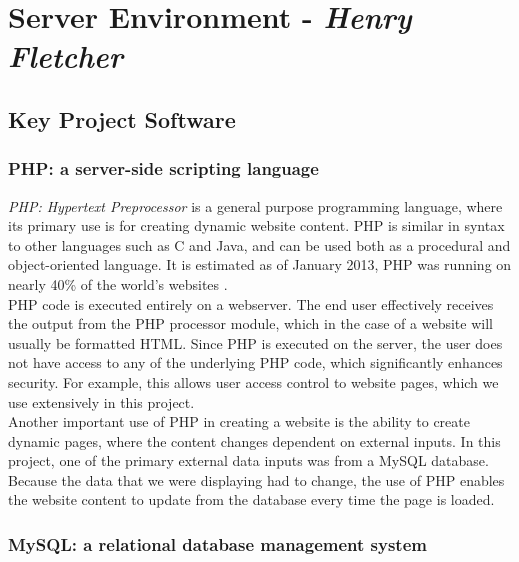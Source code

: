 \documentclass[11pt]{article}
\begin{document}
\section{Server Environment - \textit{Henry Fletcher}}
\subsection{Key Project Software}

\subsubsection{PHP: a server-side scripting language}

\textit{PHP: Hypertext Preprocessor} is a general purpose programming language, where its primary use is for creating dynamic website content. PHP is similar in syntax to other languages such as C and Java, and can be used both as a procedural and object-oriented language. It is estimated as of January 2013, PHP was running on nearly 40\% of the world's websites \cite{netcraft:PHP}.
\\ \indent
PHP code is executed entirely on a webserver. The end user effectively receives the output from the PHP processor module, which in the case of a website will usually be formatted HTML. Since PHP is executed on the server, the user does not have access to any of the underlying PHP code, which significantly enhances security. For example, this allows user access control to website pages, which we use extensively in this project.
\\ \indent
Another important use of PHP in creating a website is the ability to create dynamic pages, where the content changes dependent on external inputs. In this project, one of the primary external data inputs was from a MySQL database. Because the data that we were displaying had to change, the use of PHP enables the website content to update from the database every time the page is loaded.

\subsubsection{MySQL: a relational database management system} \label{mysql}
\end{document}
